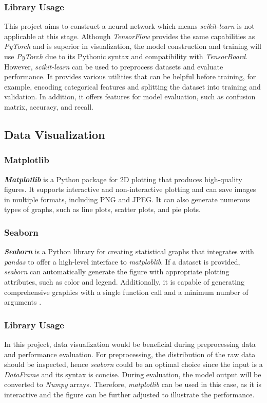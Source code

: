 \documentclass[12pt,twoside]{report}
\begin{document}
\subsubsection{Library Usage}
This project aims to construct a neural network which means \textit{scikit-learn} is not applicable at this stage. Although \textit{TensorFlow} provides the same capabilities as \textit{PyTorch} and is superior in visualization, the model construction and training will use \textit{PyTorch} due to its Pythonic syntax and compatibility with \textit{TensorBoard}. 
\\

However, \textit{scikit-learn} can be used to preprocess datasets and evaluate performance. It provides various utilities that can be helpful before training, for example, encoding categorical features and splitting the dataset into training and validation. In addition, it offers features for model evaluation, such as confusion matrix, accuracy, and recall. 

\subsection{Data Visualization}
\subsubsection{Matplotlib}
\textbf{\textit{Matplotlib}} is a Python package for 2D plotting that produces high-quality figures. It supports interactive and non-interactive plotting and can save images in multiple formats, including PNG and JPEG. It can also generate numerous types of graphs, such as line plots, scatter plots, and pie plots.

\subsubsection{Seaborn}
\textbf{\textit{Seaborn}} is a Python library for creating statistical graphs that integrates with \textit{pandas} to offer a high-level interface to \textit{matploblib}. If a dataset is provided, \textit{seaborn} can automatically generate the figure with appropriate plotting attributes, such as color and legend. Additionally, it is capable of generating comprehensive graphics with a single function call and a minimum number of arguments \citep{RN16}.

\subsubsection{Library Usage}
In this project, data visualization would be beneficial during preprocessing data and performance evaluation. For preprocessing, the distribution of the raw data should be inspected, hence \textit{seaborn} could be an optimal choice since the input is a \textit{DataFrame} and its syntax is concise. During evaluation, the model output will be converted to \textit{Numpy} arrays. Therefore, \textit{matplotlib} can be used in this case, as it is interactive and the figure can be further adjusted to illustrate the performance. 
\end{document}
